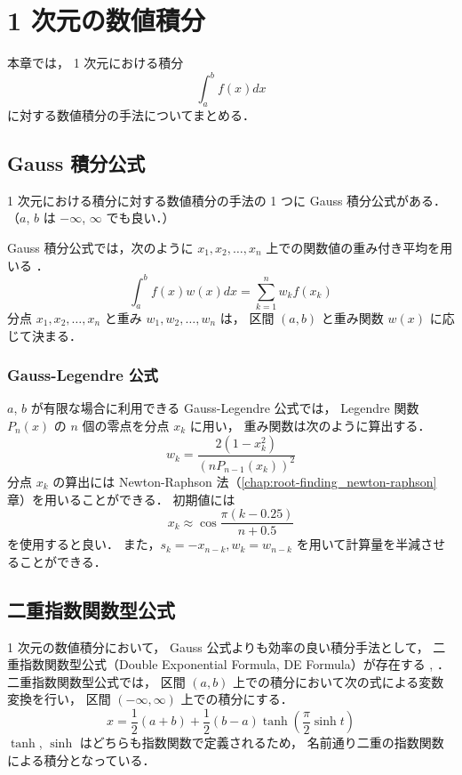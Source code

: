 %

\chapter{1 次元の数値積分}

本章では，
1 次元における積分
\begin{equation}
    \int_{a}^{b} f(x) dx
\end{equation}
に対する数値積分の手法についてまとめる．

\section{Gauss 積分公式}

1 次元における積分に対する数値積分の手法の 1 つに Gauss 積分公式がある．
（$a$, $b$ は $-\infty$, $\infty$ でも良い．）

Gauss 積分公式では，次のように $x_1, x_2, \ldots, x_n$ 上での関数値の重み付き平均を用いる
\cite{Mori1993}．
\begin{equation}
    \int_{a}^{b} f(x) w(x) dx = \sum_{k = 1}^n w_k f(x_k)
\end{equation}
分点 $x_1, x_2, \ldots, x_n$ と重み $w_1, w_2, \ldots, w_n$ は，
区間 $(a, b)$ と重み関数 $w(x)$ に応じて決まる．

\subsection{Gauss-Legendre 公式}

$a$, $b$ が有限な場合に利用できる Gauss-Legendre 公式では，
Legendre 関数 $P_n(x)$ の $n$ 個の零点を分点 $x_k$ に用い，
重み関数は次のように算出する\cite{Mori1993}．
\begin{equation}
    w_k = \frac{2(1 - x_k^2)}{(n P_{n-1}(x_k))^2}
\end{equation}
分点 $x_k$ の算出には Newton-Raphson 法（\ref{chap:root-finding_newton-raphson} 章）を用いることができる．
初期値には
\begin{equation}
    x_k \approx \cos{\frac{\pi (k - 0.25)}{n + 0.5}}
\end{equation}
を使用すると良い\cite{Mori1993}．
また，$s_k = -x_{n-k}, w_k = w_{n-k}$ を用いて計算量を半減させることができる．

\section{二重指数関数型公式}

1 次元の数値積分において，
Gauss 公式よりも効率の良い積分手法として，
二重指数関数型公式（Double Exponential Formula, DE Formula）が存在する
\cite[6.1 節 (b)]{Mori1993}, \cite[Section 4.5]{Press2007}．
二重指数関数型公式では，
区間 $(a, b)$ 上での積分において次の式による変数変換を行い，
区間 $(-\infty, \infty)$ 上での積分にする．
\begin{equation}
    x = \frac{1}{2}(a + b) + \frac{1}{2}(b - a) \tanh \left(\frac{\pi}{2} \sinh{t}\right)
\end{equation}
$\tanh$, $\sinh$ はどちらも指数関数で定義されるため，
名前通り二重の指数関数による積分となっている．


